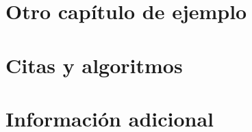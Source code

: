 \documentclass[12pt]{tesislcc}
\begin{document}
\chapter{Otro capítulo de ejemplo}


\chapter{Citas y algoritmos}



\conclusiones


\appendix

\chapter{Información adicional}


\listoffigures

\listoftables

\listofalgorithms

\listoflistings

\nocite{*}

\end{document}
